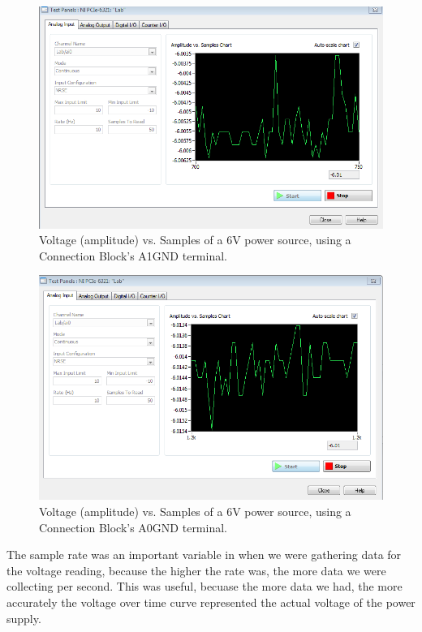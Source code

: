 \documentclass[twoside,10pt]{article}
\begin{document}
\begin{multicols}{2}
		\begin{figure}[H]
			\centering
			\includegraphics[width=\linewidth]{group 4 voltage waveform.png}
			\caption{Voltage (amplitude) vs. Samples of a 6V power source, using a Connection Block's A1GND terminal. }
		\end{figure}
		
		\begin{figure}[H]
			\centering
			\includegraphics[width=\linewidth]{group 4 voltage output for aoground.png}
			\caption{Voltage (amplitude) vs. Samples of a 6V power source, using a Connection Block's A0GND terminal. }
		\end{figure}
	
		\indent The sample rate was an important variable in when we were gathering data for the voltage reading, because the higher the rate was, the more data we were collecting per second. This was useful, becuase the more data we had, the more accurately the voltage over time curve represented the actual voltage of the power supply. 


\end{multicols}
\end{document}

